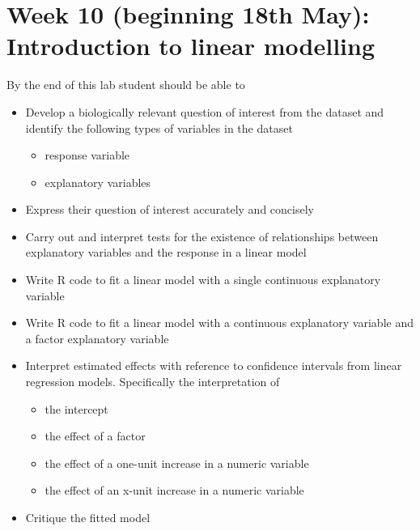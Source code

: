 \documentclass{article}
\begin{document}
\section*{Week 10 (beginning 18th May): Introduction to linear modelling}
By the end of this lab student should be able to
\begin{itemize}
\item Develop a biologically relevant question of interest  from the dataset and identify the following types of variables in the dataset
  \begin{itemize}
  \item response variable
  \item explanatory variables
  \end{itemize}
\item Express their question of interest accurately and concisely
\item Carry out and interpret tests for the existence of relationships between explanatory variables and the response in a linear model
\item Write R code to fit a linear model with a single continuous explanatory variable
\item Write R code to fit a linear model with a continuous explanatory variable and a factor explanatory variable
\item Interpret estimated effects with reference to confidence intervals from linear regression models. Specifically the interpretation of
  \begin{itemize}
  \item the intercept
  \item the effect of a factor
  \item the effect of a one-unit increase in a numeric variable
  \item the effect of an x-unit increase in a numeric variable
  \end{itemize}
\item Critique the fitted model
\end{itemize}
\end{document}
